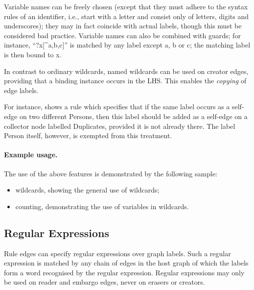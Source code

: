 Variable names can be freely chosen (except that they must adhere to the syntax
rules of an identifier, i.e., start with a letter and consist only of letters,
digits and underscores); they may in fact coincide with actual labels, though
this must be considered bad practice. Variable names can also be combined with
guards; for instance, ``\textsf{?x[\^{}a,b,c]}'' is matched by any label except
\textsf{a}, \textsf{b} or \textsf{c}; the matching label is then bound to
\textsf{x}.

In contrast to ordinary wildcards, named wildcards can be used on creator
edges, providing that a binding instance occurs in the LHS. This enables the
\emph{copying} of edge labels.

For instance,  shows a rule which specifies that if the same
label occurs as a self-edge on two different \textsf{Person}s, then this label
should be added as a self-edge on a collector node labelled
\textsf{Duplicates}, provided it is not already there. The label
\textsf{Person} itself, however, is exempted from this treatment.


\paragraph{Example usage.}

The use of the above features is demonstrated by the following \Groove sample:
%
\begin{itemize}\noitemsep
\item \textsf{wildcards}, showing the general use of wildcards;
\item \textsf{counting}, demonstrating the use of variables in wildcards.
\end{itemize}

\subsection{Regular Expressions}

Rule edges can specify regular expressions over graph labels. Such a regular
expression is matched by any chain of edges in the host graph of which the
labels form a word recognised by the regular expression. Regular expressions
may only be used on reader and embargo edges, never on erasers or creators.

